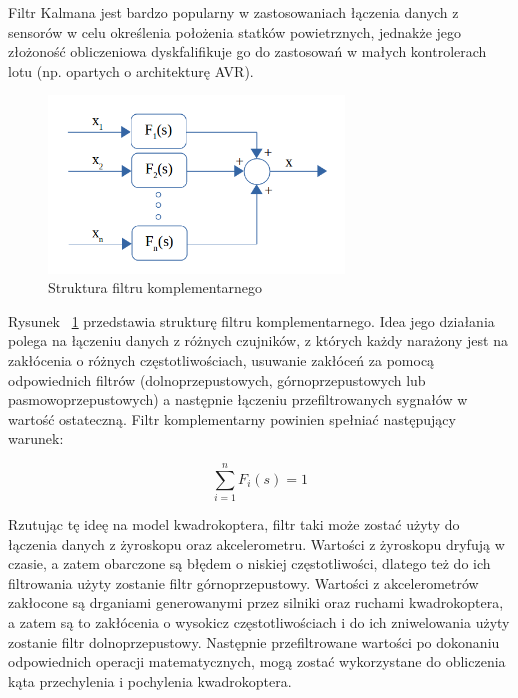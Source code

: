 Filtr Kalmana jest bardzo popularny w zastosowaniach łączenia danych z sensorów w celu określenia położenia statków powietrznych, jednakże jego złożoność obliczeniowa dyskfalifikuje go do zastosowań w małych kontrolerach lotu (np. opartych o architekturę AVR).

\begin{figure}[H]
	\centering
	\includegraphics[width=0.7\textwidth]{Pictures/complementary_filter_general.png}
		\caption[Struktura filtru komplementarnego]{Struktura filtru komplementarnego}
	\label{fig:complementary_filter_general}
\end{figure}

Rysunek ~\ref{fig:complementary_filter_general} przedstawia strukturę filtru komplementarnego. Idea jego działania polega na łączeniu danych z różnych czujników, z których każdy narażony jest na zakłócenia o różnych częstotliwościach, usuwanie zakłóceń za pomocą odpowiednich filtrów (dolnoprzepustowych, górnoprzepustowych lub pasmowoprzepustowych) a następnie łączeniu przefiltrowanych sygnałów w wartość ostateczną. Filtr komplementarny powinien spełniać następujący warunek:

\begin{equation}
	\sum_{i=1}^{n}F_{i}(s) = 1
\end{equation}

Rzutując tę ideę na model kwadrokoptera, filtr taki może zostać użyty do łączenia danych z żyroskopu oraz akcelerometru. Wartości z żyroskopu dryfują w czasie, a zatem obarczone są błędem o niskiej częstotliwości, dlatego też do ich filtrowania użyty zostanie filtr górnoprzepustowy. Wartości z akcelerometrów zakłocone są drganiami generowanymi przez silniki oraz ruchami kwadrokoptera, a zatem są to zakłócenia o wysokicz częstotliwościach i do ich zniwelowania użyty zostanie filtr dolnoprzepustowy. Następnie przefiltrowane wartości po dokonaniu odpowiednich operacji matematycznych, mogą zostać wykorzystane do obliczenia kąta przechylenia i pochylenia kwadrokoptera.

